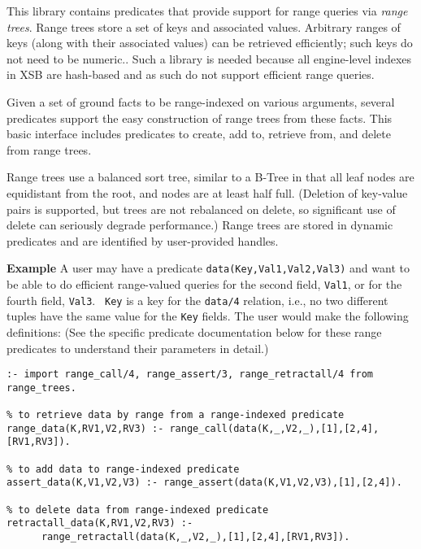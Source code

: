 This library contains predicates that provide support for range
queries via {\em range trees}.  Range trees store a set of keys and
associated values.  Arbitrary ranges of keys (along with their
associated values) can be retrieved efficiently; such keys do not need
to be numeric..  Such a library is needed because all engine-level
indexes in XSB are hash-based and as such do not support efficient
range queries.

Given a set of ground facts to be range-indexed on various arguments,
several predicates support the easy construction of range trees from
these facts.  This basic interface includes predicates to create, add
to, retrieve from, and delete from range trees.

Range trees use a balanced sort tree, similar to a B-Tree in that all
leaf nodes are equidistant from the root, and nodes are at least half
full. (Deletion of key-value pairs is supported, but trees are not
rebalanced on delete, so significant use of delete can seriously
degrade performance.)  Range trees are stored in dynamic predicates 
and are identified by user-provided handles.


{\bf Example}
A user may have a predicate {\tt data(Key,Val1,Val2,Val3)}
and want to be able to do efficient range-valued queries for the
second field, {\tt Val1}, or for the fourth field, {\tt Val3}.  {\tt
  Key} is a key for the {\tt data/4} relation, i.e., no two different
tuples have the same value for the {\tt Key} fields.  The user would
make the following definitions: (See the specific predicate
documentation below for these range predicates to understand their
parameters in detail.)

\begin{verbatim}
:- import range_call/4, range_assert/3, range_retractall/4 from range_trees.

% to retrieve data by range from a range-indexed predicate
range_data(K,RV1,V2,RV3) :- range_call(data(K,_,V2,_),[1],[2,4],[RV1,RV3]).

% to add data to range-indexed predicate
assert_data(K,V1,V2,V3) :- range_assert(data(K,V1,V2,V3),[1],[2,4]).

% to delete data from range-indexed predicate
retractall_data(K,RV1,V2,RV3) :- 
      range_retractall(data(K,_,V2,_),[1],[2,4],[RV1,RV3]).
\end{verbatim}	   

